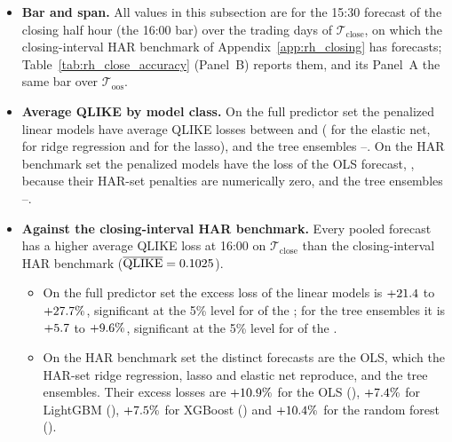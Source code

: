 \begin{itemize}
\item \textbf{Bar and span.} All values in this subsection are for the 15:30 forecast of the closing half hour (the
  16:00 bar) over the \rhoosDays{} trading days of $\mathcal T_{\mathrm{close}}$, on which the closing-interval HAR
  benchmark of Appendix~\ref{app:rh_closing} has forecasts; Table~\ref{tab:rh_close_accuracy} (Panel~B) reports them,
  and its Panel~A the same bar over $\mathcal T_{\mathrm{oos}}$.
\item \textbf{Average QLIKE by model class.} On the full predictor set the penalized linear models have average QLIKE
  losses between \rhrPoolQLinFullMin{} and \rhrPoolQLinFullMax{} (\rhrQEnetPoolFull{} for the elastic net,
  \rhrQRidgePoolFull{} for ridge regression and \rhrQLassoPoolFull{} for the lasso), and the tree ensembles
  \rhrPoolQTreeFullMin--\rhrPoolQTreeFullMax. On the HAR benchmark set the \rhrPoolNLinWord{} penalized models have
  the loss of the OLS forecast, \rhrPoolQLinHarMin, because their HAR-set penalties are numerically zero, and the tree
  ensembles \rhrPoolQTreeHarMin--\rhrPoolQTreeHarMax.
\item \textbf{Against the closing-interval HAR benchmark.} Every pooled forecast has a higher average QLIKE loss at
  16:00 on $\mathcal T_{\mathrm{close}}$ than the closing-interval HAR benchmark ($\overline{\operatorname{QLIKE}} = 0.1025$).
  \begin{itemize}
  \item On the full predictor set the excess loss of the linear models is $+21.4$ to
    $+27.7\%$, significant at the 5\% level for \rhrVsBmPoolLinFullSig{} of the
    \rhrPoolNLinWord; for the tree ensembles it is $+5.7$ to
    $+9.6\%$, significant at the 5\% level for \rhrVsBmPoolTreeFullSig{} of the
    \rhrPoolNTreeWord.
  \item On the HAR benchmark set the distinct forecasts are the OLS, which the HAR-set ridge regression, lasso and
    elastic net reproduce, and the \rhrPoolNTreeWord{} tree ensembles. Their excess losses are
    $+10.9\%$ for the OLS (\rhrVsBmRidgePoolHarPval), $+7.4\%$ for LightGBM
    (\rhrVsBmLgbmPoolHarPval), $+7.5\%$ for XGBoost (\rhrVsBmXgbPoolHarPval) and
    $+10.4\%$ for the random forest (\rhrVsBmRfPoolHarPval).

\end{itemize}
\end{itemize}
